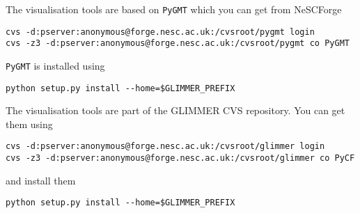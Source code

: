 The visualisation tools are based on \texttt{PyGMT} which you can get from NeSCForge
{\small
\begin{verbatim}
cvs -d:pserver:anonymous@forge.nesc.ac.uk:/cvsroot/pygmt login
cvs -z3 -d:pserver:anonymous@forge.nesc.ac.uk:/cvsroot/pygmt co PyGMT
\end{verbatim}}
\texttt{PyGMT} is installed using
{\small
\begin{verbatim}
python setup.py install --home=$GLIMMER_PREFIX
\end{verbatim}}

The visualisation tools are part of the GLIMMER CVS repository. You can get them using
{\small
\begin{verbatim}
cvs -d:pserver:anonymous@forge.nesc.ac.uk:/cvsroot/glimmer login
cvs -z3 -d:pserver:anonymous@forge.nesc.ac.uk:/cvsroot/glimmer co PyCF
\end{verbatim}}
and install them
{\small
\begin{verbatim}
python setup.py install --home=$GLIMMER_PREFIX
\end{verbatim}}
